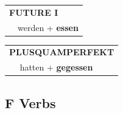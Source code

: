\documentclass[10pt,a4paper]{revtex4-2}
\begin{document}
\begin{verbbox-acc}
\begin{tabular}{rl}
    \multicolumn{2}{l}{\textbf{FUTURE I} }\\
  &  werden + \textbf{essen}\\
 
  \end{tabular}
\hfill
   \begin{tabular}{rl}
      \multicolumn{2}{l}{\textbf{PLUSQUAMPERFEKT}}\\
   & hatten + \textbf{gegessen}\\
  \end{tabular}
  
  \vspace{-5pt}


\end{verbbox-acc}

\subsection{F Verbs}
\end{document}
